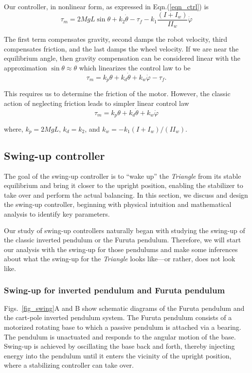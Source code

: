 \documentclass{article}
\begin{document}
Our controller, in nonlinear form, as expressed in Eqn.(\ref{eqn_ctrl}) is
\begin{equation*}
  \tau_m=2MgL\sin\theta+k_{2}\dot{\theta}-\tau_{f}-k_1\frac{(I+I_w)}{II_w}\dot{\varphi}
\end{equation*}

The first term compensates gravity, second damps the robot velocity, third compensates friction, and the last damps the wheel velocity. If we are near the equilibrium angle, then gravity compensation can be considered linear with the approximation $\sin\theta\approx\theta$ which linearizes the control law to be
\begin{equation}
  \tau_m=k_{p}\theta+k_d\dot{\theta}+k_{w}\dot{\varphi}-\tau_{f}.
\end{equation}

This requires us to determine the friction of the motor. However, the classic action of neglecting friction leads to simpler linear control law
\begin{equation}
  \tau_m=k_{p}\theta+k_d\dot{\theta}+k_{w}\dot{\varphi}
\end{equation}

where, $k_{p}=2MgL$, $k_{d}=k_{2}$, and $k_{w}=-k_{1}(I+I_w)/(II_{w})$.

\subsection{Swing-up controller}

The goal of the swing-up controller is to “wake up” the \textit{Triangle} from its stable equilibrium and bring it closer to the upright position, enabling the stabilizer to take over and perform the actual balancing. In this section, we discuss and design the swing-up controller, beginning with physical intuition and mathematical analysis to identify key parameters.

Our study of swing-up controllers naturally began with studying the swing-up of the classic inverted pendulum or the Furuta pendulum. Therefore, we will start our analysis with the swing-up for those pendulums and make some inferences about what the swing-up for the \textit{Triangle} looks like—or rather, does not look like.

\subsubsection*{Swing-up for inverted pendulum and Furuta pendulum}

Figs.~\ref{fig_swing}A and B show schematic diagrams of the Furuta pendulum and the cart-pole inverted pendulum system. The Furuta pendulum consists of a motorized rotating base to which a passive pendulum is attached via a bearing. The pendulum is unactuated and responds to the angular motion of the base. Swing-up is achieved by oscillating the base back and forth, thereby injecting energy into the pendulum until it enters the vicinity of the upright position, where a stabilizing controller can take over.
\end{document}
